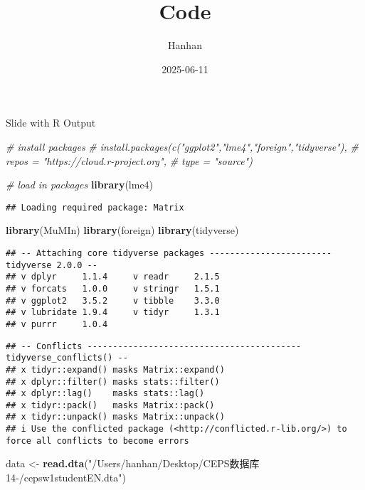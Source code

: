 \documentclass[
  ignorenonframetext,
]{beamer}
\title{Code}
\author{Hanhan}
\date{2025-06-11}
\newenvironment{Shaded}{\begin{snugshade}}{\end{snugshade}}
\newcommand{\CommentTok}[1]{\textcolor[rgb]{0.56,0.35,0.01}{\textit{#1}}}
\newcommand{\FunctionTok}[1]{\textcolor[rgb]{0.13,0.29,0.53}{\textbf{#1}}}
\newcommand{\NormalTok}[1]{#1}
\newcommand{\OtherTok}[1]{\textcolor[rgb]{0.56,0.35,0.01}{#1}}
\newcommand{\StringTok}[1]{\textcolor[rgb]{0.31,0.60,0.02}{#1}}
\begin{document}
\frame{\titlepage}

\begin{frame}[fragile]{Slide with R Output}
\label{slide-with-r-output}
\begin{Shaded}
\begin{Highlighting}[]
\CommentTok{\# install packages}
\CommentTok{\# install.packages(c("ggplot2","lme4","foreign","tidyverse"),}
\CommentTok{\#                  repos = "https://cloud.r{-}project.org",}
\CommentTok{\#                  type = "source")}

\CommentTok{\# load in packages}
\FunctionTok{library}\NormalTok{(lme4) }
\end{Highlighting}
\end{Shaded}

\begin{verbatim}
## Loading required package: Matrix
\end{verbatim}

\begin{Shaded}
\begin{Highlighting}[]
\FunctionTok{library}\NormalTok{(MuMIn) }
\FunctionTok{library}\NormalTok{(foreign)}
\FunctionTok{library}\NormalTok{(tidyverse)}
\end{Highlighting}
\end{Shaded}

\begin{verbatim}
## -- Attaching core tidyverse packages ------------------------ tidyverse 2.0.0 --
## v dplyr     1.1.4     v readr     2.1.5
## v forcats   1.0.0     v stringr   1.5.1
## v ggplot2   3.5.2     v tibble    3.3.0
## v lubridate 1.9.4     v tidyr     1.3.1
## v purrr     1.0.4
\end{verbatim}

\begin{verbatim}
## -- Conflicts ------------------------------------------ tidyverse_conflicts() --
## x tidyr::expand() masks Matrix::expand()
## x dplyr::filter() masks stats::filter()
## x dplyr::lag()    masks stats::lag()
## x tidyr::pack()   masks Matrix::pack()
## x tidyr::unpack() masks Matrix::unpack()
## i Use the conflicted package (<http://conflicted.r-lib.org/>) to force all conflicts to become errors
\end{verbatim}

\begin{Shaded}
\begin{Highlighting}[]
\NormalTok{data }\OtherTok{\textless{}{-}} \FunctionTok{read.dta}\NormalTok{(}\StringTok{"/Users/hanhan/Desktop/CEPS数据库14{-}/cepsw1studentEN.dta"}\NormalTok{) }



\end{Highlighting}
\end{Shaded}
\end{frame}
\end{document}
